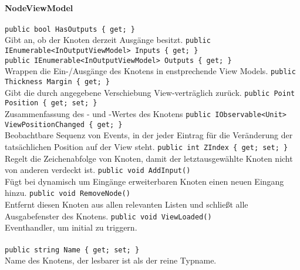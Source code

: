 \paragraph{NodeViewModel}
\begin{itemize}
	\add \verb!public bool HasOutputs { get; }! \\
	Gibt an, ob der Knoten derzeit Ausgänge besitzt.
	\add \verb!public IEnumerable<InOutputViewModel> Inputs { get; }! \\
	\verb!public IEnumerable<InOutputViewModel> Outputs { get; }! \\
	Wrappen die Ein-/Ausgänge des Knotens in enstprechende View Models.
	\add \verb!public Thickness Margin { get; }! \\
	Gibt die durch  angegebene Verschiebung View-verträglich zurück.
	\add \verb!public Point Position { get; set; }! \\
	Zusammenfassung des - und -Wertes des Knotens
	\add \verb!public IObservable<Unit> ViewPositionChanged { get; }! \\
	Beobachtbare Sequenz von Events, in der jeder Eintrag für die Veränderung der tatsächlichen Position auf der View steht.
	\add \verb!public int ZIndex { get; set; }! \\
	Regelt die Zeichenabfolge von Knoten, damit der letztausgewählte Knoten nicht von anderen verdeckt ist.
	\add \verb!public void AddInput()! \\
	Fügt bei dynamisch um Eingänge erweiterbaren Knoten einen neuen Eingang hinzu.
	\add \verb!public void RemoveNode()! \\
	Entfernt diesen Knoten aus allen relevanten Listen und schließt alle Ausgabefenster des Knotens.
	\add \verb!public void ViewLoaded()! \\
	Eventhandler, um  initial zu triggern.
\end{itemize}

\paragraph{}
\begin{itemize}
	\add \verb!public string Name { get; set; }! \\
	Name des Knotens, der lesbarer ist als der reine Typname.
\end{itemize}

